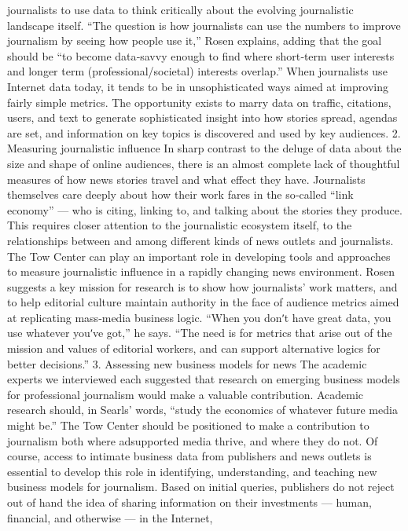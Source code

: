 journalists to use data to think critically about the evolving journalistic
landscape itself.
``The question is how journalists can use the numbers to improve
journalism by seeing how people use it,'' Rosen explains, adding that the
goal should be ``to become data‐savvy enough to find where short‐term
user interests and longer term (professional/societal) interests overlap.''
When journalists use Internet data today, it tends to be in unsophisticated
ways aimed at improving fairly simple metrics. The opportunity exists to
marry data on traffic, citations, users, and text to generate sophisticated
insight into how stories spread, agendas are set, and information on key
topics is discovered and used by key audiences.
2. Measuring journalistic influence
In sharp contrast to the deluge of data about the size and shape of online
audiences, there is an almost complete lack of thoughtful measures of how
news stories travel and what effect they have. Journalists themselves care
deeply about how their work fares in the so‐called ``link economy'' — who
is citing, linking to, and talking about the stories they produce. This
requires closer attention to the journalistic ecosystem itself, to the
relationships between and among different kinds of news outlets and
journalists.
The Tow Center can play an important role in developing tools and
approaches to measure journalistic influence in a rapidly changing news
environment. Rosen suggests a key mission for research is to show how
journalists’ work matters, and to help editorial culture maintain authority
in the face of audience metrics aimed at replicating mass‐media business
logic. ``When you donʹt have great data, you use whatever youʹve got,'' he
says. ``The need is for metrics that arise out of the mission and values of
editorial workers, and can support alternative logics for better decisions.''
3. Assessing new business models for news
The academic experts we interviewed each suggested that research on
emerging business models for professional journalism would make a
valuable contribution. Academic research should, in Searls’ words, ``study
the economics of whatever future media might be.'' The Tow Center
should be positioned to make a contribution to journalism both where adsupported
media thrive, and where they do not.
Of course, access to intimate business data from publishers and news
outlets is essential to develop this role in identifying, understanding, and
teaching new business models for journalism. Based on initial queries,
publishers do not reject out of hand the idea of sharing information on
their investments — human, financial, and otherwise — in the Internet,
